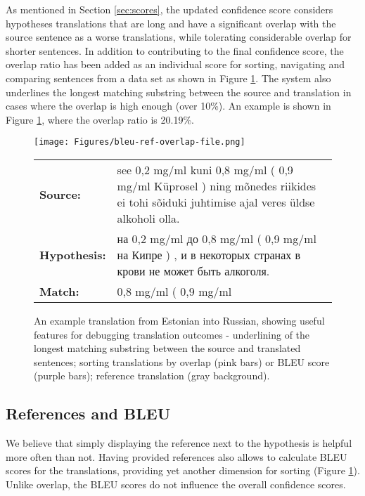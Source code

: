 \documentclass[runningheads,a4paper]{lncs/llncs}
\begin{document}
As mentioned in Section \ref{sec:scores}, the updated confidence score considers hypotheses translations that are long and have a significant overlap with the source sentence as a worse translations, while tolerating considerable overlap for shorter sentences. 
In addition to contributing to the final confidence score, the overlap ratio has been added as an individual score for sorting, navigating and comparing sentences from a data set as shown in Figure \ref{fig:overlap-bleu}.
The system also underlines the longest matching substring between the source and translation in cases where the overlap is high enough (over 10\%). An example is shown in Figure \ref{fig:overlap-bleu}, where the overlap ratio is 20.19\%. 

\begin{figure}[ht]
  \texttt{[image: Figures/bleu-ref-overlap-file.png]}
  \begin{tabular}{lp{10.4cm}}
   \bf Source: & see 0,2 mg/ml kuni 0,8 mg/ml ( 0,9 mg/ml Küprosel ) ning mõnedes riikides ei tohi sõiduki juhtimise ajal veres üldse alkoholi olla.  \\
   \bf Hypothesis: & \foreignlanguage{russian}{на 0,2 mg/ml до 0,8 mg/ml ( 0,9 mg/ml на Кипре ) , и в некоторых странах в крови не может быть алкоголя.}  \\
   \bf Match: & 0,8 mg/ml ( 0,9 mg/ml \\
  \end{tabular}
  \caption{An example translation from Estonian into Russian, showing useful features for debugging translation outcomes - underlining of the longest matching substring between the source and translated sentences; sorting translations by overlap (pink bars) or BLEU score (purple bars); reference translation (gray background).}
  \label{fig:overlap-bleu}
\end{figure}

\subsection{References and BLEU}
\label{sec:bleu}

We believe that simply displaying the reference next to the hypothesis is helpful more often than not. Having provided references also allows to calculate BLEU scores for the translations, providing yet another dimension for sorting (Figure \ref{fig:overlap-bleu}). Unlike overlap, the BLEU scores do not influence the overall confidence scores.
\end{document}

